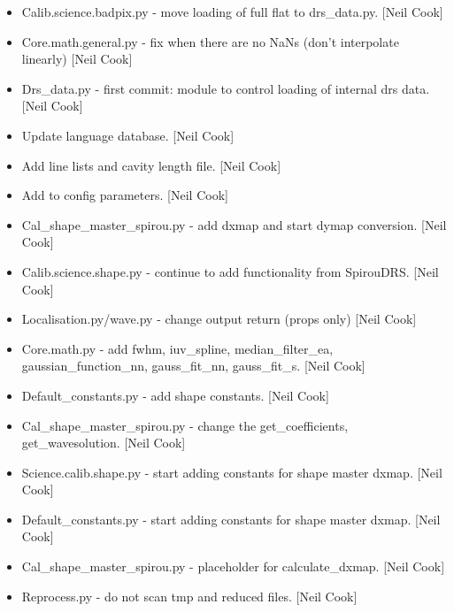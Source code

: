 \documentclass[a4paper,10pt,english]{report}
\begin{document}
\begin{itemize}
\item {} 
Calib.science.badpix.py - move loading of full flat to drs\_data.py.
{[}Neil Cook{]}

\item {} 
Core.math.general.py - fix when there are no NaNs (don’t interpolate
linearly) {[}Neil Cook{]}

\item {} 
Drs\_data.py - first commit: module to control loading of internal drs
data. {[}Neil Cook{]}

\item {} 
Update language database. {[}Neil Cook{]}

\item {} 
Add line lists and cavity length file. {[}Neil Cook{]}

\item {} 
Add to config parameters. {[}Neil Cook{]}

\item {} 
Cal\_shape\_master\_spirou.py - add dxmap and start dymap conversion.
{[}Neil Cook{]}

\item {} 
Calib.science.shape.py - continue to add functionality from SpirouDRS.
{[}Neil Cook{]}

\item {} 
Localisation.py/wave.py - change output return (props only) {[}Neil
Cook{]}

\item {} 
Core.math.py - add fwhm, iuv\_spline, median\_filter\_ea,
gaussian\_function\_nn, gauss\_fit\_nn, gauss\_fit\_s. {[}Neil Cook{]}

\item {} 
Default\_constants.py - add shape constants. {[}Neil Cook{]}

\item {} 
Cal\_shape\_master\_spirou.py - change the get\_coefficients,
get\_wavesolution. {[}Neil Cook{]}

\item {} 
Science.calib.shape.py - start adding constants for shape master
dxmap. {[}Neil Cook{]}

\item {} 
Default\_constants.py - start adding constants for shape master dxmap.
{[}Neil Cook{]}

\item {} 
Cal\_shape\_master\_spirou.py - placeholder for calculate\_dxmap. {[}Neil
Cook{]}

\item {} 
Reprocess.py - do not scan tmp and reduced files. {[}Neil Cook{]}


\end{itemize}
\end{document}
